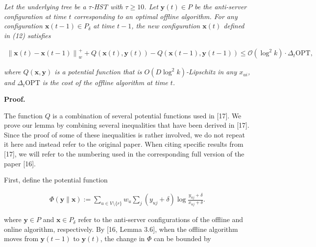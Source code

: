 \emph{Let the underlying tree be a $\tau$-HST with $\tau\geq 10$. Let ${\boldsymbol{y}}(t)\in P$ be the anti-server configuration at time $t$ corresponding to an optimal offline algorithm. For any configuration ${\boldsymbol{x}}(t-1)\in P_{\delta}$ at time $t-1$, the new configuration ${\boldsymbol{x}}(t)$ defined in (12) satisfies}\par


\[\begin{gathered}
\displaystyle\left\|{\boldsymbol{x}}(t)-{\boldsymbol{x}}(t-1)\right\|_{w}^{+} \displaystyle+Q({\boldsymbol{x}}(t),{\boldsymbol{y}}(t))-Q({\boldsymbol{x}}(t-1),{\boldsymbol{y}}(t-1))\leq\mathcal{O}\left(\log^{2}k\right)\cdot\Delta_{t}{\text{OPT}},
\end{gathered}\]


\emph{where $Q({\boldsymbol{x}},{\boldsymbol{y}})$ is a potential function that is $O(D\log^{2}k)$-Lipschitz in any $x_{ui}$, and $\Delta_{t}{\text{OPT}}$ is the cost of the offline algorithm at time $t$.}\par






\par\medskip\noindent\textbf{Proof.}\par




The function $Q$ is a combination of several potential functions used in [17]. We prove our lemma by combining several inequalities that have been derived in [17]. Since the proof of some of these inequalities is rather involved, we do not repeat it here and instead refer to the original paper. When citing specific results from [17], we will refer to the numbering used in the corresponding full version of the paper [16].\par




First, define the potential function\par


\[\begin{gathered}
\displaystyle\Phi({\boldsymbol{y}}\parallel{\boldsymbol{x}}) \displaystyle:=\sum_{u\in V\setminus\{r\}}w_{u}\sum_{j}(y_{uj}+\delta)\log\frac{y_{uj}+\delta}{x_{uj}+\delta}.
\end{gathered}\]


where ${\boldsymbol{y}}\in P$ and ${\boldsymbol{x}}\in P_{\delta}$ refer to the anti-server configurations of the offline and online algorithm, respectively. By [16, Lemma 3.6], when the offline algorithm moves from ${\boldsymbol{y}}(t-1)$ to ${\boldsymbol{y}}(t)$, the change in $\Phi$ can be bounded by\par


